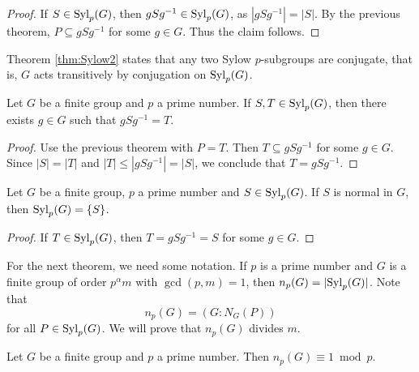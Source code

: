 \begin{proof}
If $S\in\mathrm{Syl}_p(G)$, then $gSg^{-1}\in\mathrm{Syl}_p(G)$, as $|gSg^{-1}|=|S|$. 
By the previous theorem, 
$P\subseteq gSg^{-1}$ for some $g\in G$. Thus the claim follows. 
\end{proof}

Theorem \ref{thm:Sylow2} states 
that any two Sylow $p$-subgroups are conjugate, that 
is, $G$ acts transitively 
by conjugation on $\mathrm{Syl}_p(G)$. 

\begin{theorem}
\label{thm:Sylow2}
Let $G$ be a finite group and $p$ 
a prime number. If 
$S,T\in\mathrm{Syl}_p(G)$, then there exists 
$g\in G$ such that $gSg^{-1}=T$.
\end{theorem}

\begin{proof}
Use the previous theorem with $P=T$. Then
$T\subseteq gSg^{-1}$ for some $g\in G$. Since 
$|S|=|T|$ and 
$|T|\leq |gSg^{-1}|=|S|$, we conclude that
$T=gSg^{-1}$.
\end{proof}

\begin{corollary}
Let $G$ be a finite group, $p$ a prime number and
$S\in\mathrm{Syl}_p(G)$. If $S$ is normal in $G$, then 
$\mathrm{Syl}_p(G)=\{S\}$.
\end{corollary}

\begin{proof}
If $T\in\mathrm{Syl}_p(G)$, then $T=gSg^{-1}=S$ for some $g\in G$.
\end{proof}

For the next theorem, we need some notation. If $p$
is a prime number and $G$ is a finite group of order
$p^\alpha m$ with $\gcd(p,m)=1$, then
$n_p(G)=|\mathrm{Syl}_p(G)|$. Note that 
\[
n_p(G)=(G:N_G(P))
\]
for all $P\in\mathrm{Syl}_p(G)$. We will prove that
$n_p(G)$ divides $m$.

\begin{theorem}
\label{thm:Sylow3}
Let $G$ be a finite group and $p$ a prime number. 
Then $n_p(G)\equiv 1\bmod p$.
\end{theorem}

